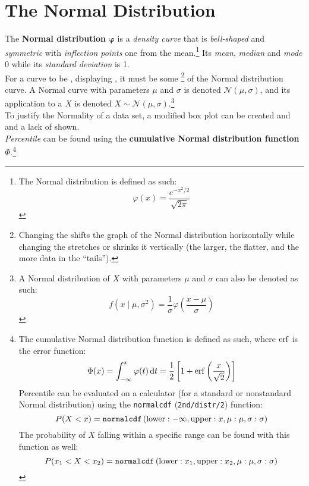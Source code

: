 \documentclass[../AP_Statistics.tex]{subfiles}
\begin{document}
		\section{The Normal Distribution}
			\begin{center}
			\end{center}
			The \textbf{Normal distribution} $\bm{\varphi}$ is a \emph{density curve} that is \emph{bell-shaped} and \emph{symmetric} with \emph{inflection points} one  from the mean.\footnote{The Normal distribution is defined as such: \[\varphi(x) = \frac{e^{-x^2/2}}{\sqrt{2\pi}}\]} Its \emph{mean}, \emph{median} and \emph{mode} 0 while its \emph{standard deviation} is 1. \\
			For a curve to be , displaying , it must be some \footnote{Changing the  shifts the graph of the Normal distribution horizontally while changing the  stretches or shrinks it vertically (the larger, the flatter, and the more data in the \enquote{tails}).} of the Normal distribution curve. A Normal curve with parameters $\mu$ and $\sigma$ is denoted $\mathcal{N}(\mu, \sigma)$, and its application to a  $X$ is denoted $X\sim\mathcal{N}(\mu,\sigma)$.\footnote{A Normal distribution of $X$ with parameters $\mu$ and $\sigma$ can also be denoted as such:\[f(x\mid\mu,\sigma^2) = \frac{1}{\sigma}\varphi\left(\frac{x - \mu}{\sigma}\right)\]} \\
			To justify the Normality of a data set, a modified box plot can be created and  and a lack of  shown. \\
			\emph{Percentile} can be found using the \textbf{cumulative Normal distribution function} $\Phi$.\footnote{The cumulative Normal distribution function is defined as such, where $\operatorname{erf}$ is the error function:\[\Phi(x) = \int_{-\infty}^x\varphi(t)\,\mathrm{d} t = \frac{1}{2}\left[1 + \operatorname{erf}\left(\frac{x}{\sqrt{2}}\right)\right]\]Percentile can be evaluated on a calculator (for a standard or nonstandard Normal distribution) using the \texttt{normalcdf} (\texttt{2nd/distr/2}) function:\[P(X < x) = \operatorname{\texttt{normalcdf}}\left(\mathrm{lower}: -\infty, \mathrm{upper}: x, \mu: \mu, \sigma: \sigma\right)\]The probability of $X$ falling within a specific range can be found with this function as well:\[P(x_1 < X < x_2) = \operatorname{\texttt{normalcdf}}\left(\mathrm{lower}: x_1, \mathrm{upper}: x_2, \mu: \mu, \sigma: \sigma\right)\]}
\end{document}
